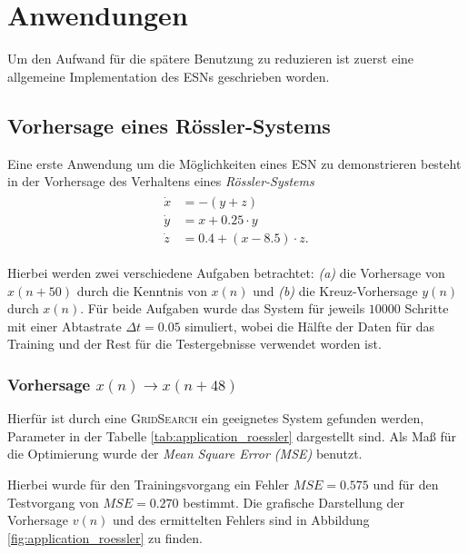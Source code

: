 \chapter{Anwendungen}
Um den Aufwand für die spätere Benutzung zu reduzieren ist zuerst eine allgemeine Implementation des \textsc{ESN}s geschrieben worden. 

\section{Vorhersage eines Rössler-Systems}
Eine erste Anwendung um die Möglichkeiten eines \textsc{ESN} zu demonstrieren besteht in der Vorhersage des Verhaltens eines \textit{Rössler-Systems}
\begin{align}
\label{eq:application_roessler_pde}
\begin{split}
\dot{x} &= -(y+z)\\
\dot{y} &= x + 0.25 \cdot  y\\
\dot{z} &= 0.4 + (x - 8.5)\cdot z.
\end{split}
\end{align}

Hierbei werden zwei verschiedene Aufgaben betrachtet: \textit{(a)} die Vorhersage von $x(n+50)$ durch die Kenntnis von $x(n)$ und \textit{(b)} die Kreuz-Vorhersage $y(n)$ durch $x(n)$. Für beide Aufgaben wurde das System für jeweils $10000$ Schritte mit einer Abtastrate $\Delta t = 0.05$ simuliert, wobei die Hälfte der Daten für das Training und der Rest für die Testergebnisse verwendet worden ist.

\subsection{Vorhersage $x(n) \rightarrow x(n+48)$}
Hierfür ist durch eine \textsc{GridSearch} ein geeignetes System gefunden werden, Parameter in der Tabelle \ref{tab:application_roessler} dargestellt sind. Als Maß für die Optimierung wurde der \textit{Mean Square Error (MSE)} benutzt.

Hierbei wurde für den Trainingsvorgang ein Fehler $MSE = 0.575$ und für den Testvorgang von $MSE = 0.270$ bestimmt. Die grafische Darstellung der Vorhersage $v(n)$ und des ermittelten Fehlers sind in Abbildung \ref{fig:application_roessler} zu finden.

